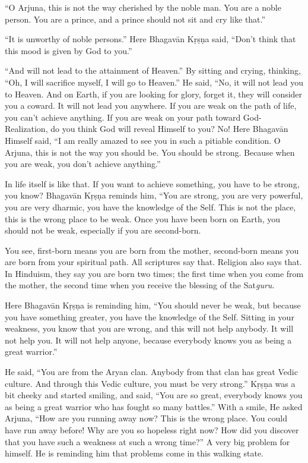 “O Arjuna, this is not the way cherished by the noble man. You are a noble person. You are a prince, and a prince should not sit and cry like that.”

“It is unworthy of noble persons.” Here Bhagavān Kṛṣṇa said, “Don’t think that this mood is given by God to you.”

“And will not lead to the attainment of Heaven.” By sitting and crying, thinking, “Oh, I will sacrifice myself, I will go to Heaven.” He said, “No, it will not lead you to Heaven. And on Earth, if you are looking for glory, forget it, they will consider you a coward. It will not lead you anywhere. If you are weak on the path of life, you can’t achieve anything. If you are weak on your path toward God-Realization, do you think God will reveal Himself to you? No! Here Bhagavān Himself said, “I am really amazed to see you in such a pitiable condition. O Arjuna, this is not the way you should be. You should be strong. Because when you are weak, you don’t achieve anything.”

In life itself is like that. If you want to achieve something, you have to be strong, you know? Bhagavān Kṛṣṇa reminds him, “You are strong, you are very powerful, you are very dharmic, you have the knowledge of the Self. This is not the place, this is the wrong place to be weak. Once you have been born on Earth, you should not be weak, especially if you are second-born.

You see, first-born means you are born from the mother, second-born means you are born from your spiritual path. All scriptures say that. Religion also says that. In Hinduism, they say you are born two times; the first time when you come from the mother, the second time when you receive the blessing of the Sat\textit{guru}.

Here Bhagavān Kṛṣṇa is reminding him, “You should never be weak, but because you have something greater, you have the knowledge of the Self. Sitting in your weakness, you know that you are wrong, and this will not help anybody. It will not help you. It will not help anyone, because everybody knows you as being a great warrior.”

He said, “You are from the Aryan clan. Anybody from that clan has great Vedic culture. And through this Vedic culture, you must be very strong.” Kṛṣṇa was a bit cheeky and started smiling, and said, “You are so great, everybody knows you as being a great warrior who has fought so many battles.” With a smile, He asked Arjuna, “How are you running away now? This is the wrong place. You could have run away before! Why are you so hopeless right now? How did you discover that you have such a weakness at such a wrong time?” A very big problem for himself. He is reminding him that problems come in this walking state.

